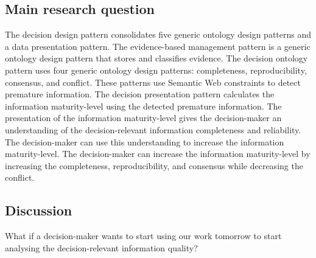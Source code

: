 \subsection{Main research question}
\begin{center}
\large\color{document}{\researchquestion}
\end{center}
The decision design pattern consolidates five generic ontology design patterns and a data presentation pattern. The evidence-based management pattern is a generic ontology design pattern that stores and classifies evidence. The decision ontology pattern uses four generic ontology design patterns: completeness, reproducibility, consensus, and conflict. These patterns use Semantic Web constraints to detect premature information. The decision presentation pattern calculates the information maturity-level using the detected premature information. The presentation of the information maturity-level gives the decision-maker an understanding of the decision-relevant information completeness and reliability. The decision-maker can use this understanding to increase the information maturity-level. The decision-maker can increase the information maturity-level by increasing the completeness, reproducibility, and consensus while decreasing the conflict. 
\begin{center}
\large\color{document}{A transparent information maturity-level allows the decision-maker to increase the information maturity-level, which contributes to evidence-based decision-making.}
\end{center}

\subsection{Discussion}
What if a decision-maker wants to start using our work tomorrow to start analysing the decision-relevant information quality? 

